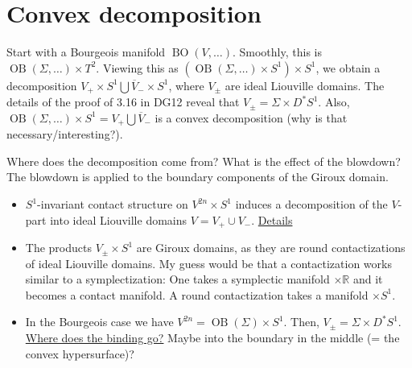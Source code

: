 \section*{Convex decomposition}

Start with a Bourgeois manifold $\operatorname{BO}(V,\dots)$.
Smoothly, this is $\operatorname{OB}(\Sigma, \dots) \times T^2$.
Viewing this as $(\operatorname{OB}(\Sigma, \dots) \times S^1) \times S^1$,
we obtain a decomposition $V_+ \times S^1 \bigcup \overline{V}_- \times S^1$,
where $V_\pm$ are ideal Liouville domains.
The details of the proof of 3.16 in DG12 reveal that $V_\pm = \Sigma \times D^*S^1$.
Also, $\operatorname{OB}(\Sigma, \dots) \times S^1 = V_+\bigcup \overline{V}_-$
is a convex decomposition (why is that necessary/interesting?).

Where does the decomposition come from? What is the effect of the blowdown?
The blowdown is applied to the boundary components of the Giroux domain.



\begin{itemize}
    \item $S^1$-invariant contact structure on $V^{2n} \times S^1$ induces a decomposition
    of the $V$-part into ideal Liouville domains $V = V_+ \cup V_-$. \underline{Details}
    \item The products $V_\pm \times S^1$ are Giroux domains, 
    as they are round contactizations of ideal Liouville domains.
    My guess would be that a contactization works similar to a symplectization:
    One takes a symplectic manifold $\times \mathbb R$ and it becomes a contact manifold.
    A round contactization takes a manifold $\times S^1$.
    \item In the Bourgeois case we have $V^{2n} = \operatorname{OB}(\Sigma) \times S^1$.
    Then, $V_\pm = \Sigma \times D^*S^1$. \underline{Where does the binding go?}
    Maybe into the boundary in the middle (= the convex hypersurface)?
\end{itemize}

